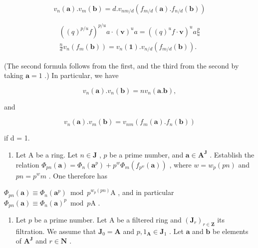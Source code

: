 \[
v _ {n} (\boldsymbol {a}). v _ {m} (\boldsymbol {b}) = d. v _ {n m / d} \left(f _ {m / d} (\boldsymbol {a}). f _ {n / d} (\boldsymbol {b})\right)
\]

\[
\begin{array}{l} ((q) ^ {p / u} f) ^ {p / u} a \cdot (\boldsymbol {v}) ^ {u} a = ((q) ^ {u} f \cdot \boldsymbol {v}) ^ {u} a \frac {p}{u} \\ \frac {n}{d} v _ {n} (f _ {m} (\boldsymbol {b})) = v _ {n} (\mathbf {1}). v _ {n / d} (f _ {m / d} (\boldsymbol {b})). \end{array}
\]

(The second formula follows from the first, and the third from the second by taking \(\boldsymbol{a} = 1\) .) In particular, we have

\[
v _ {n} (\boldsymbol {a}). v _ {n} (\boldsymbol {b}) = n v _ {n} (\boldsymbol {a}. \boldsymbol {b}),
\]

and

\[
v _ {n} (\boldsymbol {a}). v _ {m} (\boldsymbol {b}) = v _ {n m} \left(f _ {m} (\boldsymbol {a}). f _ {n} (\boldsymbol {b})\right)
\]

if d = 1.

\begin{enumerate}
\def\labelenumi{\arabic{enumi})}
\setcounter{enumi}{28}
\tightlist
\item
  Let A be a ring. Let \(n \in \mathbf{J}\) , \(p\) be a prime number, and \(\boldsymbol{a} \in \mathbf{A}^{\mathbf{J}}\) . Establish the relation \(\Phi_{pn}(\boldsymbol{a}) = \Phi_n(\boldsymbol{a}^p) + p^w\Phi_m(f_{p^w}(\boldsymbol{a}))\) , where \(w = w_p(pn)\) and \(pn = p^w m\) . One therefore has
\end{enumerate}

\(\Phi_{pn}(\boldsymbol{a}) \equiv \Phi_n(\boldsymbol{a}^p) \bmod p^{w_p(pn)}\mathrm{A}\) , and in particular \(\Phi_{pn}(\boldsymbol{a}) \equiv \Phi_n(\boldsymbol{a})^p \bmod p\mathrm{A}\) .

\begin{enumerate}
\def\labelenumi{\arabic{enumi})}
\setcounter{enumi}{29}
\tightlist
\item
  Let \(p\) be a prime number. Let A be a filtered ring and \((\mathbf{J}_r)_{r \in \mathbf{Z}}\) its filtration. We assume that \(\mathbf{J}_0 = \mathbf{A}\) and \(p, 1_{\mathbf{A}} \in \mathbf{J}_1\) . Let \(\boldsymbol{a}\) and \(\boldsymbol{b}\) be elements of \(\mathbf{A}^{\mathbf{J}}\) and \(r \in \mathbf{N}\) .
\end{enumerate}

